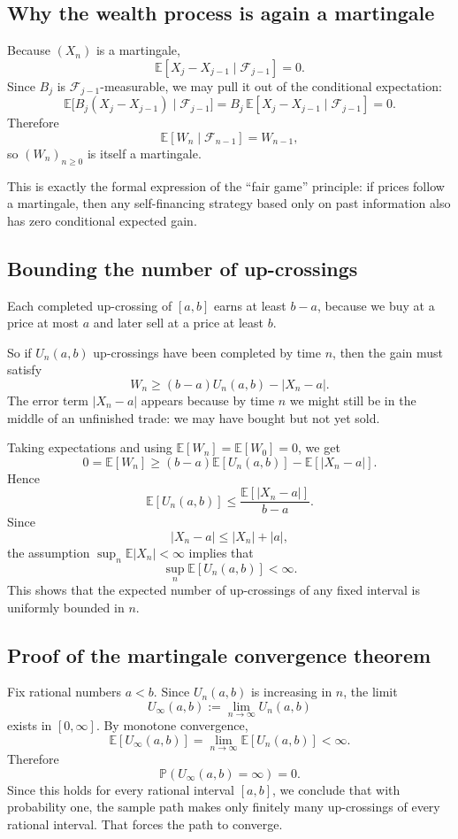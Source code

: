\documentclass[11pt]{article}
\theoremstyle{definition}
\begin{document}
\subsection{Why the wealth process is again a martingale}

Because \((X_n)\) is a martingale,
\[
\mathbb E[X_j-X_{j-1}\mid \mathcal F_{j-1}] = 0.
\]
Since \(B_j\) is \(\mathcal F_{j-1}\)-measurable, we may pull it out of the conditional expectation:
\[
\mathbb E\big[B_j(X_j-X_{j-1})\mid \mathcal F_{j-1}\big]
=
B_j\,\mathbb E[X_j-X_{j-1}\mid \mathcal F_{j-1}] = 0.
\]
Therefore
\[
\mathbb E[W_n\mid \mathcal F_{n-1}] = W_{n-1},
\]
so \((W_n)_{n\ge 0}\) is itself a martingale.

This is exactly the formal expression of the ``fair game'' principle: if prices follow a martingale, then any self-financing strategy based only on past information also has zero conditional expected gain.

\subsection{Bounding the number of up-crossings}

Each completed up-crossing of \([a,b]\) earns at least \(b-a\), because we buy at a price at most \(a\) and later sell at a price at least \(b\).

So if \(U_n(a,b)\) up-crossings have been completed by time \(n\), then the gain must satisfy
\[
W_n \ge (b-a)U_n(a,b) - |X_n-a|.
\]
The error term \(|X_n-a|\) appears because by time \(n\) we might still be in the middle of an unfinished trade: we may have bought but not yet sold.

Taking expectations and using \(\mathbb E[W_n]=\mathbb E[W_0]=0\), we get
\[
0 = \mathbb E[W_n]
\ge (b-a)\mathbb E[U_n(a,b)] - \mathbb E[|X_n-a|].
\]
Hence
\[
\mathbb E[U_n(a,b)]
\le
\frac{\mathbb E[|X_n-a|]}{b-a}.
\]
Since
\[
|X_n-a| \le |X_n|+|a|,
\]
the assumption \(\sup_n \mathbb E|X_n|<\infty\) implies that
\[
\sup_n \mathbb E[U_n(a,b)] < \infty.
\]
This shows that the expected number of up-crossings of any fixed interval is uniformly bounded in \(n\).

\subsection{Proof of the martingale convergence theorem}

Fix rational numbers \(a<b\). Since \(U_n(a,b)\) is increasing in \(n\), the limit
\[
U_\infty(a,b) := \lim_{n\to\infty} U_n(a,b)
\]
exists in \([0,\infty]\). By monotone convergence,
\[
\mathbb E[U_\infty(a,b)] = \lim_{n\to\infty} \mathbb E[U_n(a,b)] < \infty.
\]
Therefore
\[
\mathbb P(U_\infty(a,b)=\infty)=0.
\]
Since this holds for every rational interval \([a,b]\), we conclude that with probability one, the sample path makes only finitely many up-crossings of every rational interval. That forces the path to converge.
\end{document}
